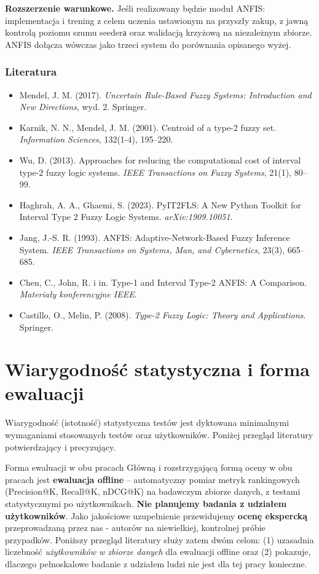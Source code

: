 \documentclass[12pt,a4paper]{article}
\newcommand{\topicsection}[1]{\subsubsection*{#1}}
\newenvironment{literatura}{%
    \topicsection{Literatura}
    \begin{itemize}[leftmargin=1.6em,labelsep=0.5em]
}{%
    \end{itemize}
}
\begin{document}
\textbf{Rozszerzenie warunkowe.} Jeśli realizowany będzie moduł ANFIS: implementacja i trening z celem uczenia ustawionym na przyszły zakup, z jawną kontrolą poziomu szumu seederа oraz walidacją krzyżową na niezależnym zbiorze. ANFIS dołącza wówczas jako trzeci system do porównania opisanego wyżej.

\begin{literatura}
\item Mendel, J. M. (2017). \textit{Uncertain Rule-Based Fuzzy Systems: Introduction and New Directions}, wyd. 2. Springer.
\item Karnik, N. N., Mendel, J. M. (2001). Centroid of a type-2 fuzzy set. \textit{Information Sciences}, 132(1-4), 195--220.
\item Wu, D. (2013). Approaches for reducing the computational cost of interval type-2 fuzzy logic systems. \textit{IEEE Transactions on Fuzzy Systems}, 21(1), 80--99.
\item Haghrah, A. A., Ghaemi, S. (2023). PyIT2FLS: A New Python Toolkit for Interval Type 2 Fuzzy Logic Systems. \textit{arXiv:1909.10051}.
\item Jang, J.-S. R. (1993). ANFIS: Adaptive-Network-Based Fuzzy Inference System. \textit{IEEE Transactions on Systems, Man, and Cybernetics}, 23(3), 665--685.
\item Chen, C., John, R. i in. Type-1 and Interval Type-2 ANFIS: A Comparison. \textit{Materiały konferencyjne IEEE}.
\item Castillo, O., Melin, P. (2008). \textit{Type-2 Fuzzy Logic: Theory and Applications}. Springer.
\end{literatura}

\newpage

\section{Wiarygodność statystyczna i forma ewaluacji}
\label{sec:liczebnosc}

Wiarygodność (istotność) statystyczna testów jest dyktowana minimalnymi wymaganiami stosowanych testów oraz użytkowników. Poniżej przegląd literatury potwierdzający i precyzujący.

\begin{infobox}{Forma ewaluacji w obu pracach}
Główną i rozstrzygającą formą oceny w obu pracach jest \textbf{ewaluacja offline} -- automatyczny pomiar metryk rankingowych (Precision@K, Recall@K, nDCG@K) na badawczym zbiorze danych, z testami statystycznymi po użytkownikach. \textbf{Nie planujemy badania z udziałem użytkowników}. Jako jakościowe uzupełnienie przewidujemy \textbf{ocenę ekspercką} przeprowadzaną przez nas - autorów na niewielkiej, kontrolnej próbie przypadków. Poniższy przegląd literatury służy zatem dwóm celom: (1) uzasadnia liczebność \emph{użytkowników w zbiorze danych} dla ewaluacji offline oraz (2) pokazuje, dlaczego pełnoskalowe badanie z udziałem ludzi nie jest dla tej pracy konieczne.
\end{infobox}
\end{document}
